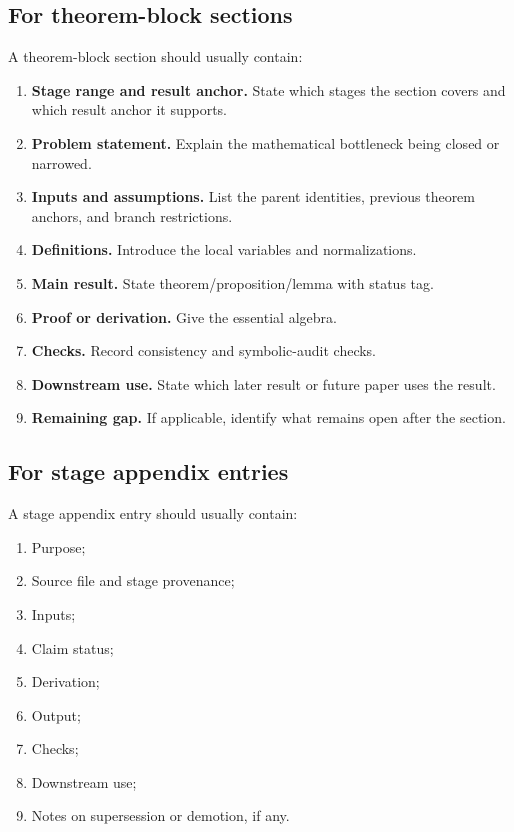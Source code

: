 \subsection{For theorem-block sections}
\label{subsec:theorem-block-template}

A theorem-block section should usually contain:
\begin{enumerate}[leftmargin=2.2em]
  \item \textbf{Stage range and result anchor.}  State which stages the section covers and which result anchor it supports.
  \item \textbf{Problem statement.}  Explain the mathematical bottleneck being closed or narrowed.
  \item \textbf{Inputs and assumptions.}  List the parent identities, previous theorem anchors, and branch restrictions.
  \item \textbf{Definitions.}  Introduce the local variables and normalizations.
  \item \textbf{Main result.}  State theorem/proposition/lemma with status tag.
  \item \textbf{Proof or derivation.}  Give the essential algebra.
  \item \textbf{Checks.}  Record consistency and symbolic-audit checks.
  \item \textbf{Downstream use.}  State which later result or future paper uses the result.
  \item \textbf{Remaining gap.}  If applicable, identify what remains open after the section.
\end{enumerate}

\subsection{For stage appendix entries}
\label{subsec:stage-entry-template}

A stage appendix entry should usually contain:
\begin{enumerate}[leftmargin=2.2em]
  \item Purpose;
  \item Source file and stage provenance;
  \item Inputs;
  \item Claim status;
  \item Derivation;
  \item Output;
  \item Checks;
  \item Downstream use;
  \item Notes on supersession or demotion, if any.
\end{enumerate}

